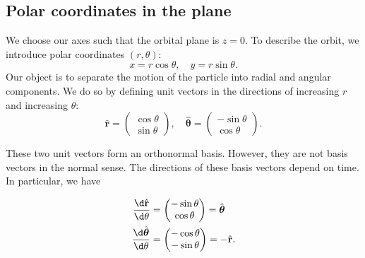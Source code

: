 \documentclass[a4paper]{article}
\begin{document}
\subsection{Polar coordinates in the plane}
We choose our axes such that the orbital plane is $z = 0$. To describe the orbit, we introduce polar coordinates $(r, \theta)$:
\[
  x = r\cos\theta, \quad y = r\sin \theta.
\]
Our object is to separate the motion of the particle into radial and angular components. We do so by defining unit vectors in the directions of increasing $r$ and increasing $\theta$:
\[
  \hat{\mathbf{r}} = \begin{pmatrix}\cos \theta\\ \sin \theta\end{pmatrix}, \quad \hat{\boldsymbol\theta} = \begin{pmatrix}-\sin \theta\\\cos\theta \end{pmatrix}.
\]
\begin{center}
\end{center}
These two unit vectors form an orthonormal basis. However, they are not basis vectors in the normal sense. The directions of these basis vectors depend on time. In particular, we have

\begin{prop}
  \begin{align*}
    \frac{\d \hat{\mathbf{r}}}{\d \theta} &= \begin{pmatrix} -\sin \theta\\ \cos \theta\end{pmatrix} = \hat{\boldsymbol\theta}\\
    \frac{\d \hat{\boldsymbol\theta}}{\d \theta} &= \begin{pmatrix}-\cos \theta\\ -\sin \theta\end{pmatrix} = -\hat{\mathbf{r}}.
  \end{align*}
\end{prop}
\end{document}
